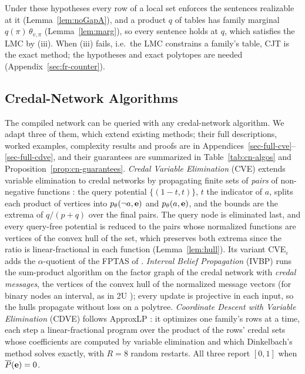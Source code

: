 \documentclass{article} %
\DeclareRobustCommand{\rev}[1]{{\color{blue}#1}}
\newenvironment{revblock}{\color{blue}}{}
\begin{document}
\rev{Under these hypotheses every row of a local set enforces the sentences realizable at it (Lemma~\ref{lem:noGapA}), and a product $q$ of tables has family marginal $q(\pi)\,\theta_{v,\pi}$ (Lemma~\ref{lem:marg}), so every sentence holds at $q$, which satisfies the LMC by (iii). When (iii) fails, i.e.\ the LMC constrains a family's table, CJT is the exact method; the hypotheses and exact polytopes are needed (Appendix~\ref{sec:fr-counter}).}

\subsection{Credal-Network Algorithms}
\label{sec-cn-algos}\label{sec-cve}\label{sec-ibp}\label{sec-cdve}

The compiled network can be queried with any credal-network algorithm. We adapt three of them, which extend existing methods; their full descriptions, worked examples, complexity results and proofs are in Appendices~\ref{sec-full-cve}--\ref{sec-full-cdve}, and their guarantees are summarized in Table~\ref{tab:cn-algos} and Proposition~\ref{prop:cn-guarantees}.
\begin{revblock}
\emph{Credal Variable Elimination} (CVE) extends variable elimination \rev{\citep{zhang-poole96,dechter-book}} to credal networks by propagating finite sets of \emph{pairs} of non-negative functions \citep{maua2012ijar,maua2020ijar}: the query potential $\{(1-t,t)\}$, $t$ the indicator of $a$, splits each product of vertices into $p_\theta(\neg a,\mathbf{e})$ and $p_\theta(a,\mathbf{e})$, and the bounds are the extrema of $q/(p+q)$ over the final pairs. The query node is eliminated last, and every query-free potential is reduced to the pairs whose normalized functions are vertices of the convex hull of the set, which preserves both extrema since the ratio is linear-fractional in each function (Lemma~\ref{lem:hull}). Its variant CVE$_\varepsilon$ adds the $\alpha$-quotient of the FPTAS of \citet{maua2012ijar}. \emph{Interval Belief Propagation} (IVBP) runs the sum-product algorithm \citep{kschischang2001factor} on the factor graph of the credal network with \emph{credal messages}, the vertices of the convex hull of the normalized message vectors (for binary nodes an interval, as in 2U \citep{2u}); every update is projective in each input, so the hulls propagate without loss on a polytree. \emph{Coordinate Descent with Variable Elimination} (CDVE) follows ApproxLP \citep{antonucci2015approxlp}: it optimizes one family's rows at a time, each step a linear-fractional program over the product of the rows' credal sets whose coefficients are computed by variable elimination and which Dinkelbach's method solves exactly, with $R=8$ random restarts. All three report $[0,1]$ when $\overline P(\mathbf{e})=0$.
\end{revblock}
\end{document}
